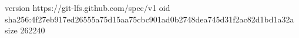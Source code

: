 version https://git-lfs.github.com/spec/v1
oid sha256:4f27eb917ed26555a75d15aa75cbc901ad0b2748dea745d31f2ac82d1bd1a32a
size 262240
